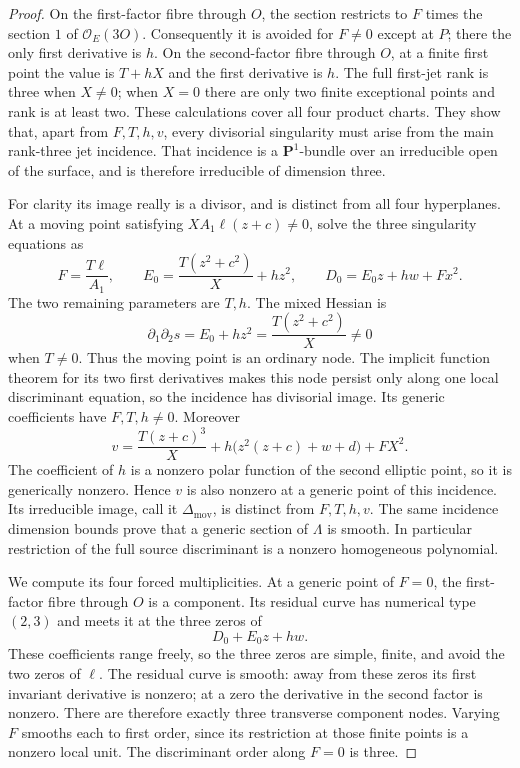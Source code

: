 \begin{proof}
On the first-factor fibre through $O$, the section restricts to
$F$ times the section $1$ of $\mathcal O_E(3O)$. Consequently it
is avoided for $F\ne0$ except at $P$; there the only first derivative
is $h$. On the second-factor fibre through $O$, at a finite first
point the value is $T+hX$ and the first derivative is $h$.
The full first-jet rank is three when $X\ne0$; when $X=0$ there
are only two finite exceptional points and rank is at least two.
These calculations cover all four product charts. They show that,
apart from $F,T,h,v$, every divisorial singularity must arise from
the main rank-three jet incidence. That incidence is a
$\mathbf P^1$-bundle over an irreducible open of the surface, and
is therefore irreducible of dimension three.

For clarity its image really is a divisor, and is distinct from all
four hyperplanes. At a moving point satisfying
$X A_1\ell(z+c)\ne0$, solve the three singularity equations as
\[
 F=\frac{T\ell}{A_1},\qquad
 E_0=\frac{T(z^2+c^2)}X+hz^2,\qquad
 D_0=E_0z+hw+Fx^2.
\]
The two remaining parameters are $T,h$. The mixed Hessian is
\[
       \partial_1\partial_2s=E_0+hz^2
                       =\frac{T(z^2+c^2)}X\ne0
\]
when $T\ne0$. Thus the moving point is an ordinary node. The
implicit function theorem for its two first derivatives makes this
node persist only along one local discriminant equation, so the
incidence has divisorial image. Its generic coefficients have
$F,T,h\ne0$. Moreover
\[
 v=\frac{T(z+c)^3}{X}
           +h\bigl(z^2(z+c)+w+d\bigr)+FX^2.
\]
The coefficient of $h$ is a nonzero polar function of the second
elliptic point, so it is generically nonzero. Hence $v$ is also
nonzero at a generic point of this incidence. Its irreducible image,
call it $\Delta_{\mathrm{mov}}$, is distinct from $F,T,h,v$.
The same incidence dimension bounds prove that a generic section
of $\Lambda$ is smooth. In particular restriction of the full
source discriminant is a nonzero homogeneous polynomial.

We compute its four forced multiplicities. At a generic point of
$F=0$, the first-factor fibre through $O$ is a component. Its
residual curve has numerical type $(2,3)$ and meets it at the three
zeros of
\[
                         D_0+E_0z+hw.
\]
These coefficients range freely, so the three zeros are simple,
finite, and avoid the two zeros of $\ell$. The residual curve is
smooth: away from these zeros its first invariant derivative is
nonzero; at a zero the derivative in the second factor is nonzero.
There are therefore exactly three transverse component nodes.
Varying $F$ smooths each to first order, since its restriction at
those finite points is a nonzero local unit. The discriminant order
along $F=0$ is three.


\end{proof}
